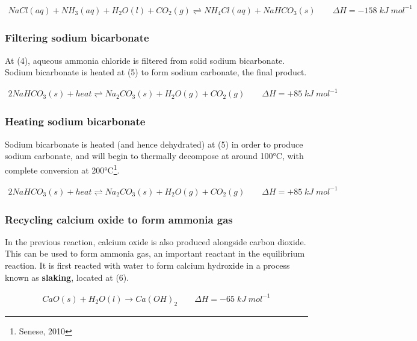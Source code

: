 \documentclass[12pt, a4paper]{article}
\begin{document}
\begin{align}
	NaCl(aq) + NH_{3}(aq) + H_{2}O(l) + CO_{2}(g) \rightleftharpoons NH_{4}Cl(aq) + NaHCO_{3}(s)  \qquad \Delta H = -158 \; kJ \; mol^{-1}
\end{align}


\subsubsection{Filtering sodium bicarbonate}

At (4), aqueous ammonia chloride is filtered from solid sodium bicarbonate. Sodium bicarbonate is heated at (5) to form sodium carbonate, the final product.

\begin{align}
	2NaHCO_{3}(s) + heat \rightleftharpoons Na_{2}CO_{3}(s) + H_{2}O(g) + CO_{2}(g) \qquad \Delta H = +85 \; kJ \; mol^{-1}
\end{align}



\subsubsection{Heating sodium bicarbonate}

Sodium bicarbonate is heated (and hence dehydrated) at (5) in order to produce sodium carbonate, and will begin to thermally decompose at around 100°C, with complete conversion at 200°C\footnote{Senese, 2010}.

\begin{align}
	2NaHCO_{3}(s) + heat \rightleftharpoons Na_{2}CO_{3}(s) + H_{2}O(g) + CO_{2}(g) \qquad \Delta H = +85 \; kJ \; mol^{-1}
\end{align}




\subsubsection{Recycling calcium oxide to form ammonia gas}

In the previous reaction, calcium oxide is also produced alongside carbon dioxide. This can be used to form ammonia gas, an important reactant in the equilibrium reaction. It is first reacted with water to form calcium hydroxide in a process known as \textbf{slaking}, located at (6).

\begin{align}
	CaO(s) + H_{2}O(l) \rightarrow Ca(OH)_{2} \qquad \Delta H = -65 \; kJ \; mol^{-1}
\end{align}
\end{document}
